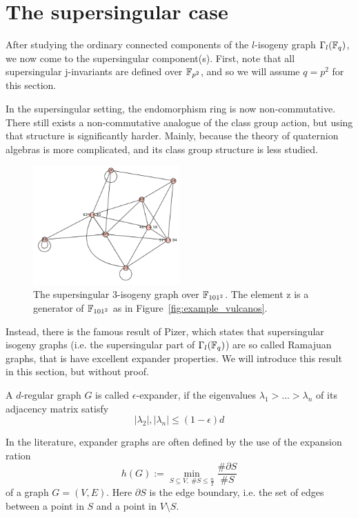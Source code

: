 \section{The supersingular case}
\label{sec:supersingular_isogeny_graph}
After studying the ordinary connected components of the $l$-isogeny graph $\Gamma_l(\mathbb{F}_q)$, we now come to the supersingular component(s).
First, note that all supersingular j-invariants are defined over $\mathbb{F}_{p^2}$, and so we will assume $q = p^2$ for this section.

In the supersingular setting, the endomorphism ring is now non-commutative.
There still exists a non-commutative analogue of the class group action, but using that structure is significantly harder.
Mainly, because the theory of quaternion algebras is more complicated, and its class group structure is less studied.
\begin{figure}
    \begin{center}
        \includegraphics[width = 0.5\textwidth]{../example_supersingular.png}
    \end{center}
    \caption{
        \label{fig:example_supersingular_graph} The supersingular 3-isogeny graph over $\mathbb{F}_{101^2}$.
        The element $\mathrm{z}$ is a generator of $\mathbb{F}_{101^2}$ as in Figure~\ref{fig:example_vulcanos}.
    }
\end{figure}
Instead, there is the famous result of Pizer, which states that supersingular isogeny graphs (i.e. the supersingular part of $\Gamma_l(\mathbb{F}_q)$) are so called Ramajuan graphs, that is have excellent expander properties.
We will introduce this result in this section, but without proof.
\begin{definition}
    \label{def:expander}
    A $d$-regular graph $G$ is called $\epsilon$-expander, if the eigenvalues $\lambda_1 > ... > \lambda_n$ of its adjacency matrix satisfy
    \begin{equation*}
        |\lambda_2|, |\lambda_n| \leq (1 - \epsilon) d
    \end{equation*}
\end{definition}
In the literature, expander graphs are often defined by the use of the expansion ration
\begin{equation*}
    h(G) := \min_{S \subseteq V, \ \#S \leq \frac n 2} \frac {\#\partial S} {\# S}
\end{equation*}
of a graph $G = (V, E)$.
Here $\partial S$ is the edge boundary, i.e. the set of edges between a point in $S$ and a point in $V \setminus S$.

